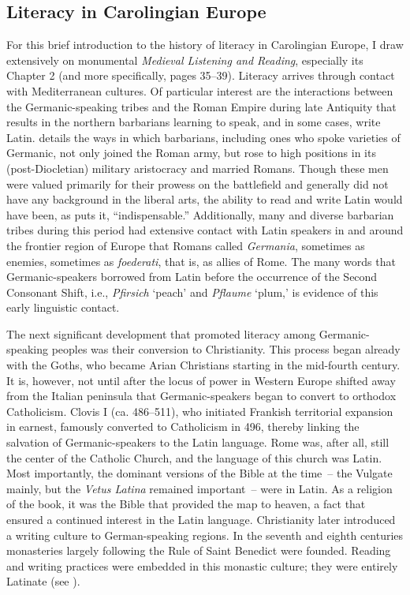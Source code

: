 \subsection{Literacy in Carolingian Europe}\label{sec:3:3.1.1}

For this brief introduction to the history of literacy in Carolingian Europe, I draw extensively on  monumental \textit{Medieval Listening and Reading}, especially its Chapter 2 (and more specifically, pages 35--39). Literacy arrives through contact with Mediterranean cultures. Of particular interest are the interactions between the Germanic-speaking tribes and the Roman Empire during late Antiquity that results in the northern barbarians learning to speak, and in some cases, write Latin. \citet[Chapter 7]{Goffart2006} details the ways in which barbarians, including ones who spoke varieties of Germanic, not only joined the Roman army, but rose to high positions in its (post-Diocletian) military aristocracy and married Romans. Though these men were valued primarily for their prowess on the battlefield and generally did not have any background in the liberal arts, the ability to read and write Latin would have been, as \citet[36--37]{Green1994} puts it, “indispensable.” Additionally, many and diverse barbarian tribes during this period had extensive contact with Latin speakers in and around the frontier region of Europe that Romans called \textit{Germania}, sometimes as enemies, sometimes as \textit{foederati}, that is, as allies of Rome. The many words that Germanic-speakers borrowed from Latin before the occurrence of the Second Consonant Shift, i.e., \textit{Pfirsich} ‘peach’ and \textit{Pflaume} ‘plum,’ is evidence of this early linguistic contact.

The next significant development that promoted literacy among Germanic-speaking peoples was their conversion to Christianity. This process began already with the Goths, who became Arian Christians starting in the mid-fourth century. It is, however, not until after the locus of power in Western Europe shifted away from the Italian peninsula that Germanic-speakers began to convert to orthodox Catholicism. Clovis I (ca. 486--511), who initiated Frankish territorial expansion in earnest, famously converted to Catholicism in 496, thereby linking the salvation of Germanic-speakers to the Latin language. Rome was, after all, still the center of the Catholic Church, and the language of this church was Latin. Most importantly, the dominant versions of the Bible at the time~-- the Vulgate mainly, but the \textit{Vetus Latina} remained important~-- were in Latin. As a religion of the book, it was the Bible that provided the map to heaven, a fact that ensured a continued interest in the Latin language. Christianity later introduced a writing culture to German-speaking regions. In the seventh and eighth centuries monasteries largely following the Rule of Saint Benedict were founded. Reading and writing practices were embedded in this monastic culture; they were entirely Latinate (see \citealt[39]{Green1994}).

